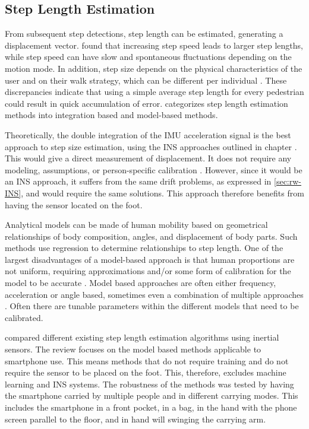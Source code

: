 

\subsection{Step Length Estimation}
\label{sec:step_length_estimation}
From subsequent step detections, step length can be estimated, generating a displacement vector. \citet{Collins2013a} found that increasing step speed leads to larger step lengths, while step speed can have slow and spontaneous fluctuations depending on the motion mode. In addition, step size depends on the physical characteristics of the user and on their walk strategy, which can be different per individual \cite{Diez2018}. These discrepancies indicate that using a simple average step length for every pedestrian could result in quick accumulation of error. \citet{Diez2018} categorizes step length estimation methods into integration based and model-based methods. \par

Theoretically, the double integration of the \ac{IMU} acceleration signal is the best approach to step size estimation, using the INS approaches outlined in chapter . This would give a direct measurement of displacement. It does not require any modeling, assumptions, or person-specific calibration \cite{Diez2018}. However, since it would be an INS approach, it suffers from the same drift problems, as expressed in \cref{sec:rw-INS}, and would require the same solutions. This approach therefore benefits from having the sensor located on the foot. \par 

Analytical models can be made of human mobility based on geometrical relationships of body composition, angles, and displacement of body parts. Such methods use regression to determine relationships to step length.  One of the largest disadvantages of a model-based approach is that human proportions are not uniform, requiring approximations and/or some form of calibration for the model to be accurate \cite{Diez2018}. Model based approaches are often either frequency, acceleration or angle based, sometimes even a combination of multiple approaches \cite{Vezocnik2019}. Often there are tunable parameters within the different models that need to be calibrated.

\citet{Vezocnik2019} compared different existing step length estimation algorithms using inertial sensors. The review focuses on the model based methods applicable to smartphone use. This means methods that do not require training and do not require the sensor to be placed on the foot. This, therefore, excludes machine learning and INS systems. The robustness of the methods was tested by having the smartphone carried by multiple people and in different carrying modes. This includes the smartphone in a front pocket, in a bag, in the hand with the phone screen parallel to the floor, and in hand will swinging the carrying arm. \par 


